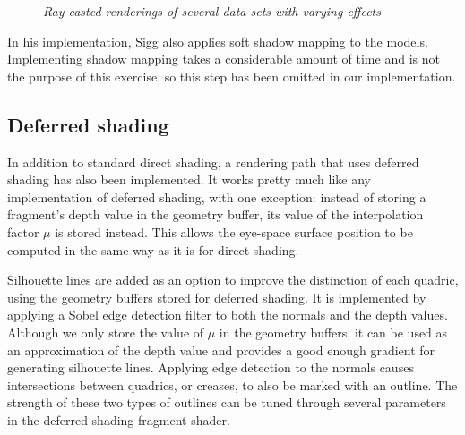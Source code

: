 \begin{figure}[!ht]
\caption{\em Ray-casted renderings of several data sets with varying effects}
\label{f:renderings}
\end{figure}

In his implementation, Sigg also applies soft shadow mapping to the models.
Implementing shadow mapping takes a considerable amount of time and is not the purpose of this exercise, 
so this step has been omitted in our implementation.

\subsection*{Deferred shading}

In addition to standard direct shading, a rendering path that uses deferred shading has also been implemented.
It works pretty much like any implementation of deferred shading, with one exception:
instead of storing a fragment's depth value in the geometry buffer, its value of the interpolation factor $\mu$ is stored instead.
This allows the eye-space surface position to be computed in the same way as it is for direct shading.

Silhouette lines are added as an option to improve the distinction of each quadric, using the geometry buffers stored for deferred shading.
It is implemented by applying a Sobel edge detection filter to both the normals and the depth values.
Although we only store the value of $\mu$ in the geometry buffers, it can be used as an approximation of the depth value and provides
a good enough gradient for generating silhouette lines.
Applying edge detection to the normals causes intersections between quadrics, or creases, to also be marked with an outline.
The strength of these two types of outlines can be tuned through several parameters in the deferred shading fragment shader.

